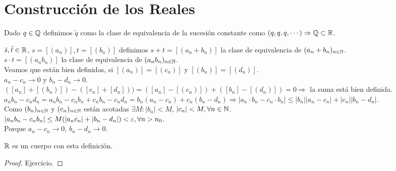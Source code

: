 \section{Construcción de los Reales}

\begin{note}
  Dado $q \in \mathbb{Q}$ definimos $\tilde{q}$ como la clase de equivalencia de la sucesión constante como $(q, q, q, \cdots) \Rightarrow \mathbb{Q} \subset \mathbb{R}$.
\end{note}

\begin{definition}
  $\tilde{s}, \tilde{t} \in \mathbb{R}$, $s = [(a_n)], t = [(b_n)]$ definimos $s+t = [(a_n + b_n)]$ la clase de equivalencia de $(a_n + b_n)_{n \in \mathbb{N}}$. \\
  $s \cdot t = [(a_n b_n)]$ la clase de equivalencia de $(a_n b_n)_{n \in \mathbb{N}}$. \\
  Veamos que están bien definidas, si $[(a_n)] = [(c_n)]$ y $[(b_n)] = [(d_n)]$. \\
  $a_n - c_n \to 0$ y $b_n - d_n \to 0$. \\
  $([a_n] + [(b_n)]) - ([c_n] +[d_n])) = ([a_n] - [(c_n)]) + ([b_n] - [(d_n)]) = 0 \Rightarrow $ la suma está bien definida. \\
  $a_n b_n - c_n d_n = a_n b_n - c_n b_n + c_n b_n - c_n d_n = b_n (a_n - c_n) + c_n (b_n - d_n) \Rightarrow |a_n \cdot b_n - c_n \cdot b_n| \leq |b_n| |a_n - c_n| + |c_n| |b_n - d_n|$. \\
  Como $(b_n)_{n \in \mathbb{N}}$ y $(c_n)_{n \in \mathbb{N}}$ están acotadas $\exists M : |b_n| < M$, $|c_n| < M, \forall n \in \mathbb{N}$. \\
  $|a_n b_n - c_n b_n| \leq M (|a_n c_n| + |b_n - d_n|) < \varepsilon, \forall n > n_0$. \\
  Porque $a_n - c_n \to 0$, $b_n - d_n \to 0$.
\end{definition}

\begin{prop}
  $\mathbb{R}$ es un cuerpo con esta definición.
  \begin{proof}
    Ejercicio.
  \end{proof}
\end{prop}

